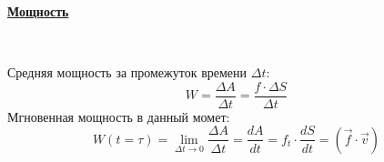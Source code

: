 \documentclass[12pt,epsfig,color,russian]{article}
\begin{document}
\underline{\bf Мощность}
\begin{center}
\\[1mm]
\end{center}
Средняя мощность за промежуток времени $\Delta t$:
   \begin{displaymath}
   W=\frac{\Delta A}{\Delta t}=\frac{f\cdot \Delta S}{\Delta t}
   \end{displaymath}
Мгновенная мощность в данный момет:
   \begin{displaymath}
   W(t=\tau)=\lim_{\Delta t\rightarrow 0}\frac{\Delta A}{\Delta t}=\frac{dA}{dt}=f_t\cdot\frac{dS}{dt}=\left(\vec{f}\cdot\vec{v}\right)
   \end{displaymath}
\end{document}
